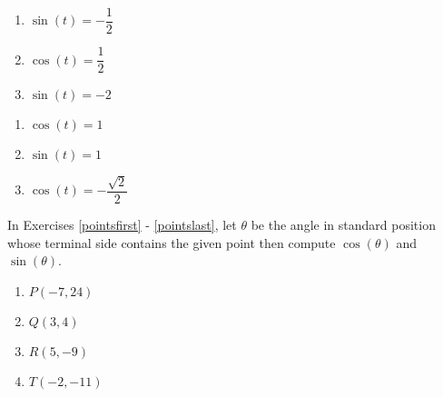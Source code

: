 \begin{multicols}{3}

\begin{enumerate}

\setcounter{enumi}{\value{HW}}

\item $\sin(t) = -\dfrac{1}{2}$
\item $\cos(t) = \dfrac{1}{2}$
\item $\sin(t) = -2$ 

\setcounter{HW}{\value{enumi}}

\end{enumerate}

\end{multicols}

\begin{multicols}{3}

\begin{enumerate}

\setcounter{enumi}{\value{HW}}

\item $\cos(t) = 1$ 
\item $\sin(t) = 1$ 
\item $\cos(t) = -\dfrac{\sqrt{2}}{2}$ \label{solvefortlast}

\setcounter{HW}{\value{enumi}}

\end{enumerate}

\end{multicols}

In Exercises \ref{pointsfirst} - \ref{pointslast}, let $\theta$ be the angle in standard position whose terminal side contains the given point then compute $\cos(\theta)$ and $\sin(\theta)$.

\begin{multicols}{4}

\begin{enumerate}

\setcounter{enumi}{\value{HW}}

\item $P(-7, 24)$ \label{pointsfirst} 
\item $Q(3, 4)$
\item $R(5, -9)$
\item $T(-2, -11)$ \label{pointslast}

\setcounter{HW}{\value{enumi}}

\end{enumerate}

\end{multicols}

